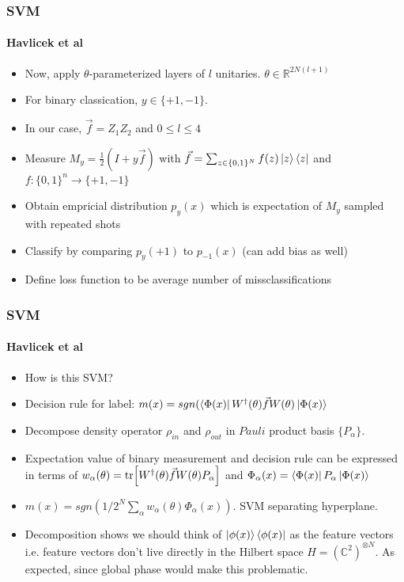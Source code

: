 \documentclass{beamer}
\newcommand\0{\mathbf{0}}
\newcommand\CC{\mathbb{C}}
\newcommand\RR{\mathbb{R}}
\begin{document}
	\begin{frame}
	\frametitle{SVM}
  	\framesubtitle{Havlicek et al}
	\begin{itemize}
	\item Now, apply $\theta$-parameterized layers of $l$ unitaries. $\theta \in \RR^{2N(l+1)}$
	\item For binary classication, $y \in \{ +1 , -1 \}$. 
	\item In our case, $\vec{f} = Z_1 Z_2$ and $0 \leq l \leq 4$
	\item Measure $ M_y = \frac{1}{2} (I + y \vec{f})$ with $\vec{f} = \sum_{z \in \{0, 1\}^N}f(z) \ket{z}\bra{z}$ and $f : \{ 0, 1\}^n \rightarrow \{ +1, -1 \}$
	\item Obtain empricial distribution $p_y(x)$ which is expectation of $M_y$ sampled with repeated shots
	\item Classify by comparing $p_y(+1)$ to $p_{-1}(x)$ (can add bias as well)
	\item Define loss function to be average number of missclassifications
	\end{itemize}
	\end{frame}
	
	\begin{frame}
	\frametitle{SVM}
  	\framesubtitle{Havlicek et al}
  	\begin{itemize}
  	\item How is this SVM?
  	\item Decision rule for label: $m(x) = sgn (\bra{\Phi(x)} W^\dag(\theta) \vec{f} W(\theta) \ket{\Phi(x)}$
  	\item Decompose density operator $\rho_{in}$ and $\rho_{out}$ in $Pauli$ product basis $\{P_\alpha\}$. 
  	\item Expectation value of binary measurement and decision rule can be expressed in terms of $w_\alpha(\theta) = \tr [W^\dag(\theta) \vec{f} W(\theta) P_\alpha]$ and $\Phi_\alpha(x) = \bra{\Phi(x)} P_\alpha\ket{\Phi(x)}$
  	\item $m(x) = sgn(1/2^N \sum_\alpha w_\alpha(\theta) \Phi_\alpha(x))$. SVM separating hyperplane.
  	\item Decomposition shows we should think of $\ket{\phi(x)}\bra{\phi(x)}$ as the feature vectors i.e. feature vectors don't live directly in the Hilbert space $H = (\CC^2)^{\otimes N}$. As expected, since global phase would make this problematic.
  	\end{itemize}
  	\end{frame}
\end{document}

